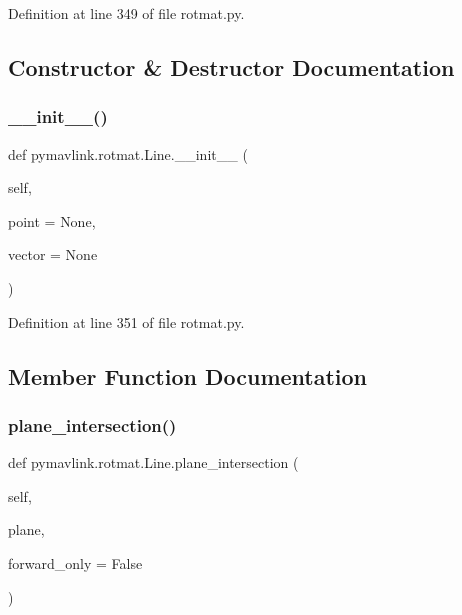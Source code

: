 Definition at line 349 of file rotmat.\+py.



\subsection{Constructor \& Destructor Documentation}
\mbox{\label{classpymavlink_1_1rotmat_1_1Line_a885c853f5c7389037763a1c096e3522b}} 
\subsubsection{\texorpdfstring{\_\_init\_\_()}{\_\_init\_\_()}}
{\footnotesize\ttfamily def pymavlink.\+rotmat.\+Line.\+\_\+\+\_\+init\+\_\+\+\_\+ (\begin{DoxyParamCaption}\item[{}]{self,  }\item[{}]{point = {\ttfamily None},  }\item[{}]{vector = {\ttfamily None} }\end{DoxyParamCaption})}



Definition at line 351 of file rotmat.\+py.



\subsection{Member Function Documentation}
\mbox{\label{classpymavlink_1_1rotmat_1_1Line_a798d84ee7809f0fd49a80421776f78b4}} 
\subsubsection{\texorpdfstring{plane\_intersection()}{plane\_intersection()}}
{\footnotesize\ttfamily def pymavlink.\+rotmat.\+Line.\+plane\+\_\+intersection (\begin{DoxyParamCaption}\item[{}]{self,  }\item[{}]{plane,  }\item[{}]{forward\+\_\+only = {\ttfamily False} }\end{DoxyParamCaption})}

